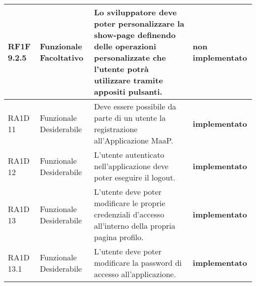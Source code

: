 \begin{longtable}{ | l | p{2cm} | p{5cm} | p{4cm}| }
          
        RF1F 9.2.5 & Funzionale \newline  Facoltativo  & Lo sviluppatore deve poter personalizzare la show-page definendo delle operazioni personalizzate che l’utente potrà utilizzare tramite appositi pulsanti. & \textbf{{\color{red} non implementato}} \newline  \\ \hline      
          
             
        RA1D 11 & Funzionale \newline  Desiderabile  & Deve essere possibile da parte di un utente la registrazione all’Applicazione MaaP. & \textbf{{\color{green} implementato}} \newline  \\ \hline      
        RA1D 12 & Funzionale \newline  Desiderabile  & L’utente autenticato nell’applicazione deve poter eseguire il logout. & \textbf{{\color{green} implementato}} \newline  \\ \hline      
        RA1D 13 & Funzionale \newline  Desiderabile  & L'utente deve poter modificare le proprie credenziali d'accesso all'interno della propria pagina profilo. & \textbf{{\color{green} implementato}} \newline  \\ \hline      
        RA1D 13.1 & Funzionale \newline  Desiderabile  & L’utente deve poter modificare la password di accesso all’applicazione. & \textbf{{\color{green} implementato}} \newline  \\ \hline      
        

\end{longtable}
